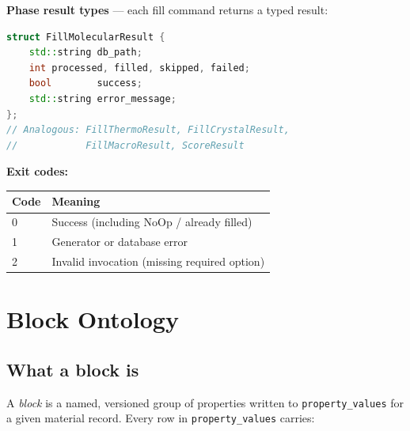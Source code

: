 \documentclass[11pt,letterpaper]{article}
\begin{document}
\textbf{Phase result types} --- each fill command returns a typed result:

\begin{lstlisting}[language=C++]
struct FillMolecularResult {
	std::string db_path;
	int processed, filled, skipped, failed;
	bool        success;
	std::string error_message;
};
// Analogous: FillThermoResult, FillCrystalResult,
//            FillMacroResult, ScoreResult
\end{lstlisting}

\textbf{Exit codes:}

\begin{center}
\begin{tabular}{ll}
\toprule
Code & Meaning \\
\midrule
0 & Success (including NoOp / already filled) \\
1 & Generator or database error \\
2 & Invalid invocation (missing required option) \\
\bottomrule
\end{tabular}
\end{center}

\section{Block Ontology}

\subsection{What a block is}

A \emph{block} is a named, versioned group of properties written to
\texttt{property\_values} for a given material record.  Every row in
\texttt{property\_values} carries:
\end{document}
